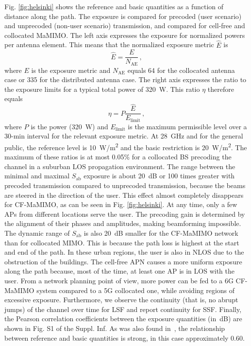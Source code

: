 \documentclass{IEEEtran}
\begin{document}
Fig. \ref{fig:helsinki} shows the reference and basic quantities as a function of distance along the path. The exposure is compared for precoded (user scenario) and unprecoded (non-user scenario) transmission, and compared for cell-free and collocated \gls{MaMIMO}. The left axis expresses the exposure for normalized powers per antenna element. This means that the normalized exposure metric $\hat{E}$ is 
\begin{equation}
\label{eq:E_normalized}
    \hat{E} = \frac{E}{N_\mathrm{AE}} \, ,
\end{equation}
where $E$ is the exposure metric and $N_\mathrm{AE}$ equals 64 for the collocated antenna case or 335 for the distributed antenna case. The right axis expresses the ratio to the exposure limits for a typical total power of 320~W. This ratio $\eta$ therefore equals
\begin{equation}
\label{eq:eta_ratio}
    \eta = P \frac{\hat{E}}{E_\mathrm{limit}} \, ,
\end{equation}
where $P$ is the power (320~W) and $E_\mathrm{limit}$ is the maximum permissible level over a 30-min interval for the relevant exposure metric. At 28~GHz and for the general public, the reference level is \SI{10}{W/m^2} and the basic restriction is \SI{20}{W/m^2}. The maximum of these ratios is at most 0.05\% for a collocated \gls{BS} precoding the channel in a suburban LOS propagation environment. The range between the minimal and maximal $S_\mathrm{ab}$ exposure is about 20~dB or 100 times greater with precoded transmission compared to unprecoded transmission, because the beams are steered in the direction of the user. This effect almost completely disappears for \gls{CF-MaMIMO}, as can be seen in Fig. \ref{fig:helsinki}. At any time, only a few \glspl{AP} from different locations serve the user. The precoding gain is determined by the alignment of their phases and amplitudes, making beamforming impossible. The dynamic range of $S_\mathrm{ab}$ is also 20~dB smaller for the \gls{CF-MaMIMO} network than for collocated MIMO. This is because the path loss is highest at the start and end of the path. In these urban regions, the user is also in \gls{NLOS} due to the obstruction of the buildings. The cell-free \gls{APN} causes a more uniform exposure along the path because, most of the time, at least one \gls{AP} is in \gls{LOS} with the user. From a network planning point of view, more power can be fed to a \gls{6G} \gls{CF-MaMIMO} system compared to a \gls{5G} collocated one, while avoiding regions of excessive exposure. Furthermore, we observe the continuity (that is, no abrupt jumps) of the channel over time for \gls{LSF} and report continuity for \gls{SSF}. Finally, the Pearson correlation coefficients between the exposure quantities (in~dB) are shown in Fig. S1 of the Suppl. Inf. As was also found in~\cite{RT/FDTD2}, the relationship between reference and basic quantities is strong, in this case approximately 0.60.
\end{document}
